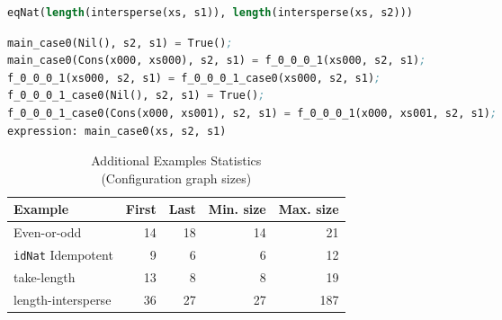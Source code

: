\documentclass[submission,copyright,creativecommons]{eptcs}
\begin{document}
\begin{lstlisting}[language=Lisp,keywords={},caption=length-intersperse Expression]
eqNat(length(intersperse(xs, s1)), length(intersperse(xs, s2)))
\end{lstlisting}

\begin{lstlisting}[language=Lisp,keywords={},caption=length-intersperse Last/Minimal Result]
main_case0(Nil(), s2, s1) = True();
main_case0(Cons(x000, xs000), s2, s1) = f_0_0_0_1(xs000, s2, s1);
f_0_0_0_1(xs000, s2, s1) = f_0_0_0_1_case0(xs000, s2, s1);
f_0_0_0_1_case0(Nil(), s2, s1) = True();
f_0_0_0_1_case0(Cons(x000, xs001), s2, s1) = f_0_0_0_1(x000, xs001, s2, s1);
expression: main_case0(xs, s2, s1)
\end{lstlisting}

\begin{table}
  \centering
  \caption{Additional Examples Statistics\\(Configuration graph sizes)}\label{tbl:MoreExamplesStats}
  \begin{tabular}{l|r|r|r|r}
    \hline
    Example                 & First & Last & Min. size & Max. size \\ \hline
    Even-or-odd             &    14 &   18 &        14 &        21 \\
    \verb|idNat| Idempotent &     9 &    6 &         6 &        12 \\
    take-length             &    13 &    8 &         8 &        19 \\
    length-intersperse      &    36 &   27 &        27 &       187 \\
  \end{tabular}
\end{table}

\fi
\end{document}
